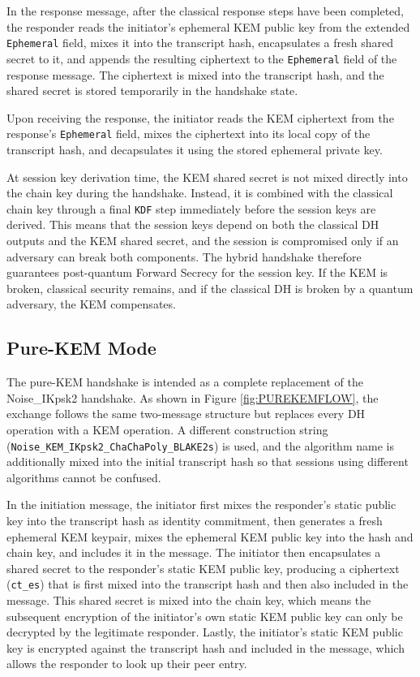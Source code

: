 In the response message, after the classical response steps have been completed, the responder reads the initiator's ephemeral KEM public key from the extended \texttt{Ephemeral} field, mixes it into the transcript hash, encapsulates a fresh shared secret to it, and appends the resulting ciphertext to the \texttt{Ephemeral} field of the response message. The ciphertext is mixed into the transcript hash, and the shared secret is stored temporarily in the handshake state.

Upon receiving the response, the initiator reads the KEM ciphertext from the response's \texttt{Ephemeral} field, mixes the ciphertext into its local copy of the transcript hash, and decapsulates it using the stored ephemeral private key. 

At session key derivation time, the KEM shared secret is not mixed directly into the chain key during the handshake. Instead, it is combined with the classical chain key through a final \texttt{KDF} step immediately before the session keys are derived. This means that the session keys depend on both the classical DH outputs and the KEM shared secret, and the session is compromised only if an adversary can break both components. The hybrid handshake therefore guarantees post-quantum Forward Secrecy for the session key. If the KEM is broken, classical security remains, and if the classical DH is broken by a quantum adversary, the KEM compensates.


\subsection{Pure-KEM Mode}\label{sec:method-purekem}
The pure-KEM handshake is intended as a complete replacement of the Noise\_IKpsk2 handshake. As shown in Figure \ref{fig:PUREKEMFLOW}, the exchange follows the same two-message structure but replaces every DH operation with a KEM operation. A different construction string (\texttt{Noise\_KEM\_IKpsk2\_ChaChaPoly\_BLAKE2s}) is used, and the algorithm name is additionally mixed into the initial transcript hash so that sessions using different algorithms cannot be confused.

In the initiation message, the initiator first mixes the responder's static public key into the transcript hash as identity commitment, then generates a fresh ephemeral KEM keypair, mixes the ephemeral KEM public key into the hash and chain key, and includes it in the message. The initiator then encapsulates a shared secret to the responder's static KEM public key, producing a ciphertext (\texttt{ct\_es}) that is first mixed into the transcript hash and then also included in the message. This shared secret is mixed into the chain key, which means the subsequent encryption of the initiator's own static KEM public key can only be decrypted by the legitimate responder. Lastly, the initiator's static KEM public key is encrypted against the transcript hash and included in the message, which allows the responder to look up their peer entry. 


